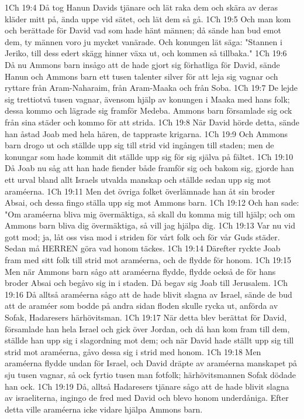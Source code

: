1Ch 19:4  Då tog Hanun Davids tjänare och lät raka dem och skära av deras kläder mitt på, ända uppe vid sätet, och lät dem så gå.
1Ch 19:5  Och man kom och berättade för David vad som hade hänt männen; då sände han bud emot dem, ty männen voro ju mycket vanärade. Och konungen lät säga: "Stannen i Jeriko, till dess edert skägg hinner växa ut, och kommen så tillbaka."
1Ch 19:6  Då nu Ammons barn insågo att de hade gjort sig förhatliga för David, sände Hanun och Ammons barn ett tusen talenter silver för att leja sig vagnar och ryttare från Aram-Naharaim, från Aram-Maaka och från Soba.
1Ch 19:7  De lejde sig trettiotvå tusen vagnar, ävensom hjälp av konungen i Maaka med hans folk; dessa kommo och lägrade sig framför Medeba. Ammons barn församlade sig ock från sina städer och kommo för att strida.
1Ch 19:8  När David hörde detta, sände han åstad Joab med hela hären, de tappraste krigarna.
1Ch 19:9  Och Ammons barn drogo ut och ställde upp sig till strid vid ingången till staden; men de konungar som hade kommit dit ställde upp sig för sig själva på fältet.
1Ch 19:10  Då Joab nu såg att han hade fiender både framför sig och bakom sig, gjorde han ett urval bland allt Israels utvalda manskap och ställde sedan upp sig mot araméerna.
1Ch 19:11  Men det övriga folket överlämnade han åt sin broder Absai, och dessa fingo ställa upp sig mot Ammons barn.
1Ch 19:12  Och han sade: "Om araméerna bliva mig övermäktiga, så skall du komma mig till hjälp; och om Ammons barn bliva dig övermäktiga, så vill jag hjälpa dig.
1Ch 19:13  Var nu vid gott mod; ja, låt oss visa mod i striden för vårt folk och för vår Guds städer. Sedan må HERREN göra vad honom täckes.
1Ch 19:14  Därefter ryckte Joab fram med sitt folk till strid mot araméerna, och de flydde för honom.
1Ch 19:15  Men när Ammons barn sågo att araméerna flydde, flydde också de för hans broder Absai och begåvo sig in i staden. Då begav sig Joab till Jerusalem.
1Ch 19:16  Då alltså araméerna sågo att de hade blivit slagna av Israel, sände de bud att de araméer som bodde på andra sidan floden skulle rycka ut, anförda av Sofak, Hadaresers härhövitsman.
1Ch 19:17  När detta blev berättat för David, församlade han hela Israel och gick över Jordan, och då han kom fram till dem, ställde han upp sig i slagordning mot dem; och när David hade ställt upp sig till strid mot araméerna, gåvo dessa sig i strid med honom.
1Ch 19:18  Men araméerna flydde undan för Israel, och David dräpte av araméerna manskapet på sju tusen vagnar, så ock fyrtio tusen man fotfolk; härhövitsmannen Sofak dödade han ock.
1Ch 19:19  Då, alltså Hadaresers tjänare sågo att de hade blivit slagna av israeliterna, ingingo de fred med David och blevo honom underdåniga. Efter detta ville araméerna icke vidare hjälpa Ammons barn.
